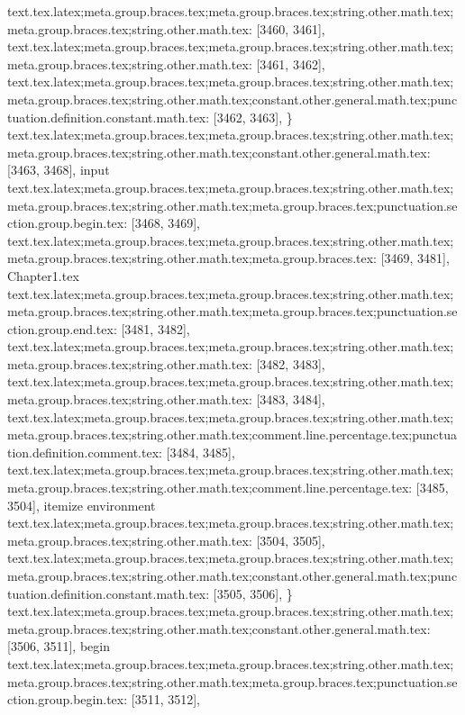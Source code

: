 {{{{{{{{{{{{{{{{{{{{{{{{{{{{{{{{{{{{{{{{{{{{{{{{{{{{{{{{{{{{{{{{{{{{{{{{{{{{{{{{{{{{{{{{{{{{{{{{{{{{{{{{text.tex.latex;meta.group.braces.tex;meta.group.braces.tex;string.other.math.tex;meta.group.braces.tex;string.other.math.tex: [3460, 3461], {
}
text.tex.latex;meta.group.braces.tex;meta.group.braces.tex;string.other.math.tex;meta.group.braces.tex;string.other.math.tex: [3461, 3462], {
}
text.tex.latex;meta.group.braces.tex;meta.group.braces.tex;string.other.math.tex;meta.group.braces.tex;string.other.math.tex;constant.other.general.math.tex;punctuation.definition.constant.math.tex: [3462, 3463], {\}
text.tex.latex;meta.group.braces.tex;meta.group.braces.tex;string.other.math.tex;meta.group.braces.tex;string.other.math.tex;constant.other.general.math.tex: [3463, 3468], {input}
text.tex.latex;meta.group.braces.tex;meta.group.braces.tex;string.other.math.tex;meta.group.braces.tex;string.other.math.tex;meta.group.braces.tex;punctuation.section.group.begin.tex: [3468, 3469], {{}
text.tex.latex;meta.group.braces.tex;meta.group.braces.tex;string.other.math.tex;meta.group.braces.tex;string.other.math.tex;meta.group.braces.tex: [3469, 3481], {Chapter1.tex}
text.tex.latex;meta.group.braces.tex;meta.group.braces.tex;string.other.math.tex;meta.group.braces.tex;string.other.math.tex;meta.group.braces.tex;punctuation.section.group.end.tex: [3481, 3482], {}}
text.tex.latex;meta.group.braces.tex;meta.group.braces.tex;string.other.math.tex;meta.group.braces.tex;string.other.math.tex: [3482, 3483], {
}
text.tex.latex;meta.group.braces.tex;meta.group.braces.tex;string.other.math.tex;meta.group.braces.tex;string.other.math.tex: [3483, 3484], {
}
text.tex.latex;meta.group.braces.tex;meta.group.braces.tex;string.other.math.tex;meta.group.braces.tex;string.other.math.tex;comment.line.percentage.tex;punctuation.definition.comment.tex: [3484, 3485], {%
text.tex.latex;meta.group.braces.tex;meta.group.braces.tex;string.other.math.tex;meta.group.braces.tex;string.other.math.tex;comment.line.percentage.tex: [3485, 3504], {itemize environment}
text.tex.latex;meta.group.braces.tex;meta.group.braces.tex;string.other.math.tex;meta.group.braces.tex;string.other.math.tex: [3504, 3505], {
}
text.tex.latex;meta.group.braces.tex;meta.group.braces.tex;string.other.math.tex;meta.group.braces.tex;string.other.math.tex;constant.other.general.math.tex;punctuation.definition.constant.math.tex: [3505, 3506], {\}
text.tex.latex;meta.group.braces.tex;meta.group.braces.tex;string.other.math.tex;meta.group.braces.tex;string.other.math.tex;constant.other.general.math.tex: [3506, 3511], {begin}
text.tex.latex;meta.group.braces.tex;meta.group.braces.tex;string.other.math.tex;meta.group.braces.tex;string.other.math.tex;meta.group.braces.tex;punctuation.section.group.begin.tex: [3511, 3512], {{}
}}}}}}}}}}}}}}}}}}}}}}}}}}}}}}}}}}}}}}}}}}}}}}}}}}}}}}}}}}}}}}}}}}}}}}}}}}}}}}}}}}}}}}}}}}}}}}}}}}}}}}}}}}}}
